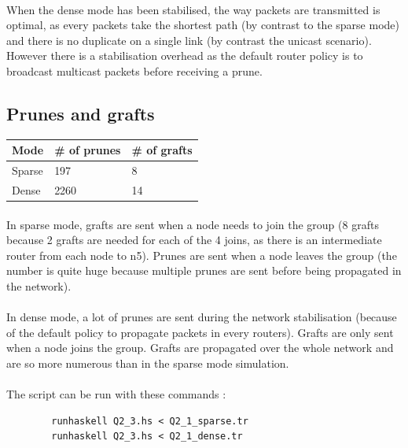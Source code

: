 \documentclass[a4paper]{article}
\begin{document}
    \paragraph{}When the dense mode has been stabilised, the way packets are
transmitted is optimal, as every packets take the shortest path (by contrast to
the sparse mode) and there is no duplicate on a single link (by contrast the
unicast scenario).
\newline However there is a stabilisation overhead as the default router policy
is to broadcast multicast packets before receiving a prune.

  \subsection{Prunes and grafts}

    \begin{center}
        \begin{tabular}{|l|l|l|}
            \hline
            Mode   & \# of prunes & \# of grafts \\
            \hline
            Sparse & 197          & 8 \\
            Dense  & 2260         & 14 \\
            \hline
        \end{tabular}
    \end{center}

    \paragraph{}In sparse mode, grafts are sent when a node needs to join the
group (8 grafts because 2 grafts are needed for each of the 4 joins, as
there is an intermediate router from each node to n5).
\newline Prunes are sent when a node leaves the group (the number is quite huge
because multiple prunes are sent before being propagated in the network).

    \paragraph{}In dense mode, a lot of prunes are sent during the network
stabilisation (because of the default policy to propagate packets in every
routers). Grafts are only sent when a node joins the group. Grafts are propagated
over the whole network and are so more numerous than in the sparse mode
simulation.

    \paragraph{}The script can be run with these commands :
    \begin{verbatim}
        runhaskell Q2_3.hs < Q2_1_sparse.tr
        runhaskell Q2_3.hs < Q2_1_dense.tr
    \end{verbatim}
\end{document}
